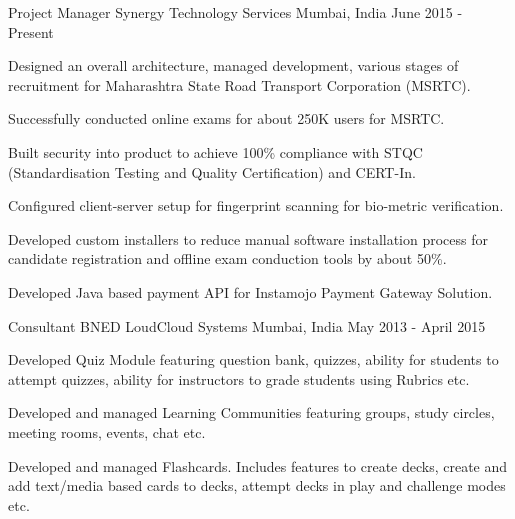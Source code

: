 

\begin{cventries}

  \cventry
    {Project Manager} %
    {Synergy Technology Services} %
    {Mumbai, India} %
    {June 2015 - Present} %
    {
      \begin{cvitems} %
        \item {Designed an overall architecture, managed development, various stages of recruitment for Maharashtra State Road Transport Corporation (MSRTC).}
        \item {Successfully conducted online exams for about 250K users for MSRTC.}
        \item {Built security into product to achieve 100\% compliance with STQC (Standardisation Testing and Quality Certification) and CERT-In.}
        \item {Configured client-server setup for fingerprint scanning for bio-metric verification.}
        \item {Developed custom installers to reduce manual software installation process for candidate registration and offline exam conduction tools by about 50\%.}
        \item {Developed Java based payment API for Instamojo Payment Gateway Solution.}
      \end{cvitems}
    }

  \cventry
  {Consultant} %
  {BNED LoudCloud Systems} %
  {Mumbai, India} %
  {May 2013 - April 2015} %
  {
  \begin{cvitems} %
    \item {Developed Quiz Module featuring question bank, quizzes, ability for students to attempt quizzes, ability for instructors to grade students using Rubrics etc.}
    \item {Developed and managed Learning Communities featuring groups, study circles, meeting rooms, events, chat etc.}
    \item {Developed and managed Flashcards. Includes features to create decks, create and add text/media based cards to decks, attempt decks in play and challenge modes etc.}
  \end{cvitems}
  }


\end{cventries}

